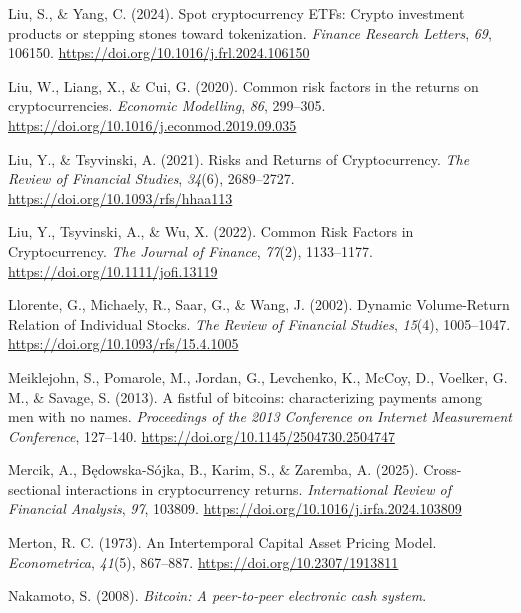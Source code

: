 \documentclass[
  12pt,
  a4paper,
  openany]{scrbook}
\newlength{\cslhangindent}
\newenvironment{CSLReferences}[2] %
 {\begin{list}{}{%
  \setlength{\itemindent}{0pt}
  \setlength{\leftmargin}{0pt}
  \setlength{\parsep}{0pt}
  \ifodd #1
   \setlength{\leftmargin}{\cslhangindent}
   \setlength{\itemindent}{-1\cslhangindent}
  \fi
  \setlength{\itemsep}{#2\baselineskip}}}
 {\end{list}}
\begin{document}
\begin{CSLReferences}{1}{0}
Liu, S., \& Yang, C. (2024). Spot cryptocurrency ETFs: Crypto investment
products or stepping stones toward tokenization. \emph{Finance Research
Letters}, \emph{69}, 106150.
\url{https://doi.org/10.1016/j.frl.2024.106150}

Liu, W., Liang, X., \& Cui, G. (2020). Common risk factors in the
returns on cryptocurrencies. \emph{Economic Modelling}, \emph{86},
299--305. \url{https://doi.org/10.1016/j.econmod.2019.09.035}

Liu, Y., \& Tsyvinski, A. (2021). Risks and Returns of Cryptocurrency.
\emph{The Review of Financial Studies}, \emph{34}(6), 2689--2727.
\url{https://doi.org/10.1093/rfs/hhaa113}

Liu, Y., Tsyvinski, A., \& Wu, X. (2022). Common Risk Factors in
Cryptocurrency. \emph{The Journal of Finance}, \emph{77}(2), 1133--1177.
\url{https://doi.org/10.1111/jofi.13119}

Llorente, G., Michaely, R., Saar, G., \& Wang, J. (2002). Dynamic
Volume-Return Relation of Individual Stocks. \emph{The Review of
Financial Studies}, \emph{15}(4), 1005--1047.
\url{https://doi.org/10.1093/rfs/15.4.1005}

Meiklejohn, S., Pomarole, M., Jordan, G., Levchenko, K., McCoy, D.,
Voelker, G. M., \& Savage, S. (2013). A fistful of bitcoins:
characterizing payments among men with no names. \emph{Proceedings of
the 2013 Conference on Internet Measurement Conference}, 127--140.
\url{https://doi.org/10.1145/2504730.2504747}

Mercik, A., Będowska-Sójka, B., Karim, S., \& Zaremba, A. (2025).
Cross-sectional interactions in cryptocurrency returns.
\emph{International Review of Financial Analysis}, \emph{97}, 103809.
\url{https://doi.org/10.1016/j.irfa.2024.103809}

Merton, R. C. (1973). An Intertemporal Capital Asset Pricing Model.
\emph{Econometrica}, \emph{41}(5), 867--887.
\url{https://doi.org/10.2307/1913811}

Nakamoto, S. (2008). \emph{Bitcoin: A peer-to-peer electronic cash
system}.


\end{CSLReferences}
\end{document}

